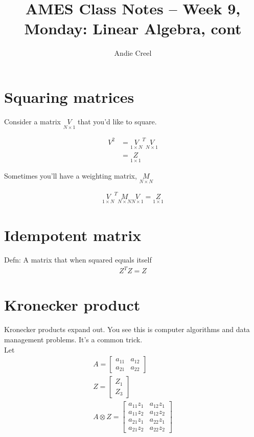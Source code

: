 \documentclass{article}
\title{AMES Class Notes -- Week 9, Monday: Linear Algebra, cont}
\author{Andie Creel}
\begin{document}
\maketitle

\section{Squaring matrices}

Consider a matrix $\underset{N \times 1}{V}$ that you'd like to square. 

\begin{align}
    V^2 &= \underset{1 \times N} V^T  \underset{N \times 1}V\\
    &= \underset{ 1 \times 1} Z
\end{align}

Sometimes you'll have a weighting matrix, $\underset{ N \times N}M$

\begin{align}
   \underset{1 \times N} V^T \underset{ N \times N}M  \underset{N\times 1}V = \underset{ 1 \times 1}  Z   
\end{align}


\section{Idempotent matrix}
Defn: A matrix that when squared equals itself 
\begin{align}
    Z^T Z = Z
\end{align}

\section{Kronecker product}

Kronecker products expand out. You see this is computer algorithms and data management problems. It's a common trick. \\

Let
\begin{align}
    A = \begin{bmatrix}
            a_{11} & a_{12} \\
            a_{21} & a_{22}
        \end{bmatrix} \\
    Z = \begin{bmatrix}
        Z_1 \\
        Z_3 
    \end{bmatrix}\\
    A \otimes Z = \begin{bmatrix}
                    a_11 z_1 & a_12 z_1 \\
                    a_11 z_2 & a_12 z_2 \\
                    a_21 z_1 & a_22 z_1 \\
                    a_21 z_2 & a_22 z_2
                \end{bmatrix}
\end{align}
\end{document}
